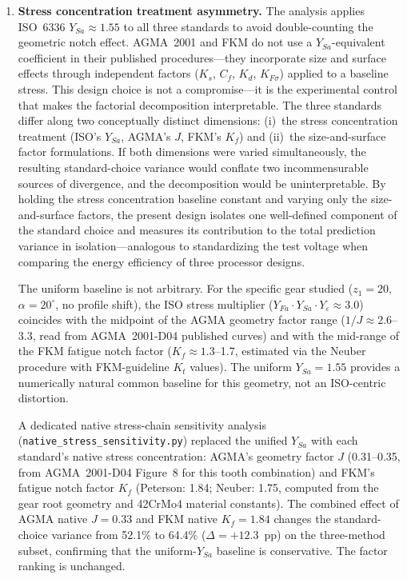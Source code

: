 \documentclass[twocolumn,12pt,a4paper]{article}
\begin{document}
\begin{enumerate}
  \item \textbf{Stress concentration treatment asymmetry.} The analysis
        applies ISO~6336 $Y_{Sa} \approx 1.55$ to all three standards to
        avoid double-counting the geometric notch effect. AGMA~2001
        and FKM do not use a $Y_{Sa}$-equivalent coefficient in their
        published procedures---they incorporate size and surface effects
        through independent factors ($K_s$, $C_f$, $K_d$, $K_{F\sigma}$)
        applied to a baseline stress. This design choice is not a
        compromise---it is the experimental control that makes the
        factorial decomposition interpretable. The three standards differ
        along two conceptually distinct dimensions: (i)~the stress
        concentration treatment (ISO's $Y_{Sa}$, AGMA's $J$, FKM's
        $K_f$) and (ii)~the size-and-surface factor formulations. If both
        dimensions were varied simultaneously, the resulting
        standard-choice variance would conflate two incommensurable sources
        of divergence, and the decomposition would be uninterpretable. By
        holding the stress concentration baseline constant and varying only
        the size-and-surface factors, the present design isolates one
        well-defined component of the standard choice and measures its
        contribution to the total prediction variance in
        isolation---analogous to standardizing the test voltage when
        comparing the energy efficiency of three processor designs.

        The uniform baseline is not arbitrary. For the specific gear
        studied ($z_1=20$, $\alpha=20^\circ$, no profile shift), the
        ISO stress multiplier ($Y_{Fa} \cdot Y_{Sa} \cdot Y_\varepsilon
        \approx 3.0$) coincides with the midpoint of the AGMA geometry
        factor range ($1/J \approx 2.6$--3.3, read from AGMA~2001-D04
        published curves) and with the mid-range of the FKM fatigue notch
        factor ($K_f \approx 1.3$--1.7, estimated via the Neuber
        procedure with FKM-guideline $K_t$ values). The uniform
        $Y_{Sa}=1.55$ provides a numerically natural common baseline
        for this geometry, not an ISO-centric distortion.

        A dedicated native stress-chain sensitivity analysis
        (\texttt{native\_stress\_sensitivity.py}) replaced the unified
        $Y_{Sa}$ with each standard's native stress concentration:
        AGMA's geometry factor $J$ (0.31--0.35, from AGMA~2001-D04
        Figure~8 for this tooth combination) and FKM's fatigue notch
        factor $K_f$ (Peterson: 1.84; Neuber: 1.75, computed from the
        gear root geometry and 42CrMo4 material constants). The combined
        effect of AGMA native $J=0.33$ and FKM native $K_f=1.84$ changes
        the standard-choice variance from 52.1\% to 64.4\%
        ($\Delta = +12.3$~pp) on the three-method subset, confirming
        that the uniform-$Y_{Sa}$ baseline is conservative. The factor
        ranking is unchanged.


\end{enumerate}
\end{document}

